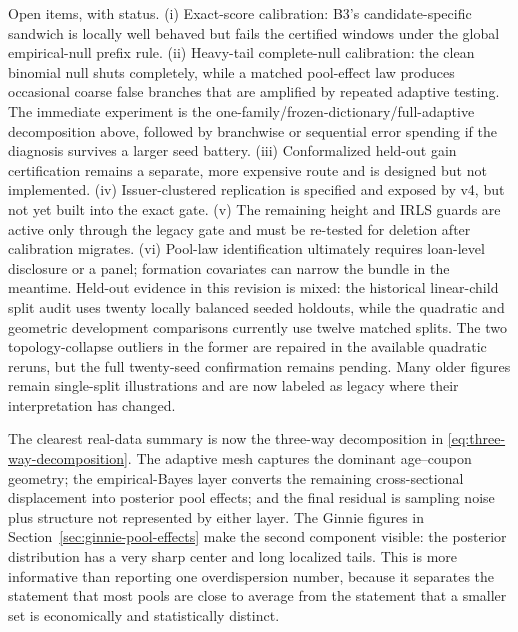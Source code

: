 \documentclass[11pt]{article}
\begin{document}
Open items, with status. (i) Exact-score calibration: B3's candidate-specific
sandwich is locally well behaved but fails the certified windows under the global
empirical-null prefix rule. (ii) Heavy-tail complete-null calibration: the clean binomial
null shuts completely, while a matched pool-effect law produces occasional coarse false
branches that are amplified by repeated adaptive testing. The immediate experiment is the
one-family/frozen-dictionary/full-adaptive decomposition above, followed by branchwise or
sequential error spending if the diagnosis survives a larger seed battery. (iii)
Conformalized held-out gain certification remains a separate, more expensive route and is
designed but not implemented. (iv) Issuer-clustered replication is specified and exposed
by v4, but not yet built into the exact gate. (v) The remaining height and IRLS guards are
active only through the legacy gate and must be re-tested for deletion after calibration
migrates. (vi) Pool-law identification ultimately requires loan-level disclosure or a
panel; formation covariates can narrow the bundle in the meantime. Held-out evidence in
this revision is mixed: the historical linear-child split audit uses twenty locally balanced seeded
holdouts, while the quadratic and geometric development comparisons currently use twelve matched
splits. The two topology-collapse outliers in the former are repaired in the available quadratic
reruns, but the full twenty-seed confirmation remains pending. Many older figures remain single-split
illustrations and are now labeled as legacy where their interpretation has changed.

The clearest real-data summary is now the three-way decomposition in
\eqref{eq:three-way-decomposition}. The adaptive mesh captures the dominant age--coupon geometry;
the empirical-Bayes layer converts the remaining cross-sectional displacement into posterior pool
effects; and the final residual is sampling noise plus structure not represented by either layer.
The Ginnie figures in Section~\ref{sec:ginnie-pool-effects} make the second component visible: the
posterior distribution has a very sharp center and long localized tails. This is more informative
than reporting one overdispersion number, because it separates the statement that most pools are
close to average from the statement that a smaller set is economically and statistically distinct.
\end{document}

